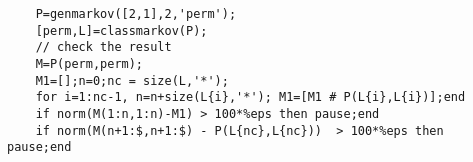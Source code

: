 \begin{examples}
  \begin{Verbatim}
    P=genmarkov([2,1],2,'perm');
    [perm,L]=classmarkov(P);
    // check the result 
    M=P(perm,perm);
    M1=[];n=0;nc = size(L,'*');
    for i=1:nc-1, n=n+size(L{i},'*'); M1=[M1 # P(L{i},L{i})];end 
    if norm(M(1:n,1:n)-M1) > 100*%eps then pause;end
    if norm(M(n+1:$,n+1:$) - P(L{nc},L{nc}))  > 100*%eps then pause;end

  \end{Verbatim}
\end{examples}
\begin{manseealso}
     
\end{manseealso}
